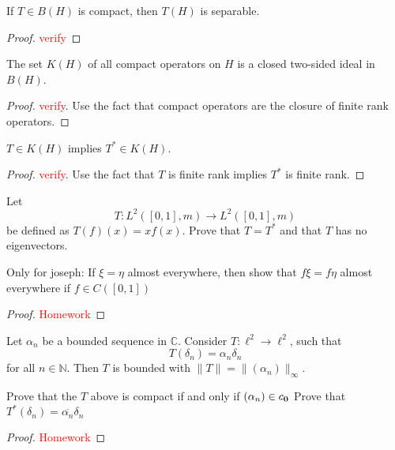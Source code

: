 
\begin{lemma}
  If $T \in B(H)$ is compact, then $T(H)$ is separable.
\end{lemma}
\begin{proof}
  \textcolor{red}{verify}
\end{proof}

\begin{corollary}
  The set $K(H)$ of all compact operators on $  H$ is a closed
  two-sided ideal in $B(H)$.
\end{corollary}
\begin{proof}
  \textcolor{red}{verify}. Use the fact that compact operators are
  the closure of finite rank operators.
\end{proof}

\begin{corollary}
  $T \in K(H)$ implies $T^* \in K(H)$.
\end{corollary}
\begin{proof}
  \textcolor{red}{verify}. Use the fact that $T$ is finite rank
  implies $T^*$ is finite rank.
\end{proof}

\begin{example}
  Let \[
    T: L^2([0, 1], m) \to L^2([0, 1], m)
  \]
  be defined as $T(f)(x) = xf(x)$. Prove that $T = T^*$ and that $T$
  has no eigenvectors.

  Only for joseph: If $\xi = \eta$ almost everywhere, then show that  $f \xi = f
  \eta$ almost everywhere if $ f \in C([0, 1])$
\end{example}
\begin{proof}
  \textcolor{red}{Homework}
\end{proof}

\begin{example}
  Let $\alpha_n$ be a bounded sequence in $\mathbb{C}$. Consider $T :
  \ell^2 \to \ell^2$, such that \[
    T(\delta_n) = \alpha_n \delta_n
  \]
  for all $n \in \mathbb{N}$. Then $T$ is bounded with $\|T\| =
  \|(\alpha_n)\|_\infty$.
\end{example}

\begin{example}
  Prove that the $T$ above is compact if and only if $(\alpha_n) \in c_{\bf 0}$
  Prove that $T^*(\delta_n) = \overline{\alpha_n}\delta_n$
\end{example}
\begin{proof}
  \textcolor{red}{Homework}
\end{proof}

